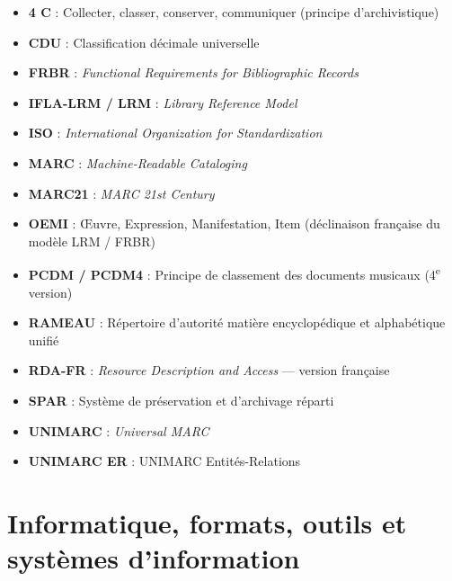 \begin{itemize}
	\item \textbf{4 C} : Collecter, classer, conserver, communiquer (principe d'archivistique)
	\item \textbf{CDU} : Classification décimale universelle
	\item \textbf{FRBR} : \textit{Functional Requirements for Bibliographic Records}
	\item \textbf{IFLA-LRM / LRM} : \textit{Library Reference Model}
	\item \textbf{ISO} : \textit{International Organization for Standardization}
	\item \textbf{MARC} : \textit{Machine-Readable Cataloging}
	\item \textbf{MARC21} : \textit{MARC 21st Century}
	\item \textbf{OEMI} : Œuvre, Expression, Manifestation, Item (déclinaison française du modèle LRM / FRBR)
	\item \textbf{PCDM / PCDM4} : Principe de classement des documents musicaux (4\textsuperscript{e} version)
	\item \textbf{RAMEAU} : Répertoire d'autorité matière encyclopédique et alphabétique unifié
	\item \textbf{RDA-FR} : \textit{Resource Description and Access} — version française
	\item \textbf{SPAR} : Système de préservation et d'archivage réparti
	\item \textbf{UNIMARC} : \textit{Universal MARC}
	\item \textbf{UNIMARC ER} : UNIMARC Entités-Relations
\end{itemize}

\section*{Informatique, formats, outils et systèmes d'information}

